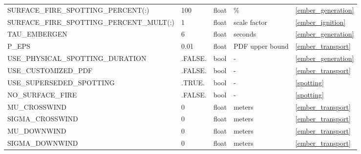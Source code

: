 \begin{landscape}
\begin{center}
\begin{longtable}{lllll}
SURFACE\_FIRE\_SPOTTING\_PERCENT(:)          & 100                        & float                  & \%                                 & \ref{ember_generation}               \\
SURFACE\_FIRE\_SPOTTING\_PERCENT\_MULT(:)    & 1                          & float                  & scale factor                       & \ref{ember_ignition}                 \\
TAU\_EMBERGEN                                & 6                          & float                  & seconds                            & \ref{ember_generation}               \\
P\_EPS                                       & 0.01                       & float                  & PDF upper bound                    & \ref{ember_transport}                \\
USE\_PHYSICAL\_SPOTTING\_DURATION            & .FALSE.                    & bool                   & -                                  & \ref{ember_generation}               \\
USE\_CUSTOMIZED\_PDF                         & .FALSE.                    & bool                   & -                                  & \ref{ember_transport}                \\
USE\_SUPERSEDED\_SPOTTING                    & .TRUE.                     & bool                   & -                                  & \ref{spotting}                       \\
NO\_SURFACE\_FIRE                            & .FALSE.                    & bool                   & -                                  & \ref{spotting}                       \\
MU\_CROSSWIND                                & 0                          & float                  & meters                             & \ref{ember_transport}                \\
SIGMA\_CROSSWIND                             & 0                          & float                  & meters                             & \ref{ember_transport}                \\
MU\_DOWNWIND                                 & 0                          & float                  & meters                             & \ref{ember_transport}                \\
SIGMA\_DOWNWIND                              & 0                          & float                  & meters                             & \ref{ember_transport}                \\

\end{longtable}
\end{center}
\end{landscape}
